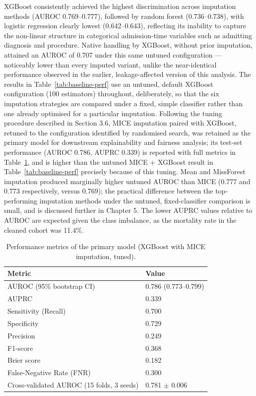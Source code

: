 \documentclass[12pt,a4paper]{report}
\begin{document}
XGBoost consistently achieved the highest discrimination across imputation methods (AUROC 0.769--0.777), followed by random forest (0.736--0.738), with logistic regression clearly lowest (0.642--0.643), reflecting its inability to capture the non-linear structure in categorical admission-time variables such as admitting diagnosis and procedure. Native handling by XGBoost, without prior imputation, attained an AUROC of 0.707 under this same untuned configuration --- noticeably lower than every imputed variant, unlike the near-identical performance observed in the earlier, leakage-affected version of this analysis. The results in Table~\ref{tab:baseline-perf} use an untuned, default XGBoost configuration (100 estimators) throughout, deliberately, so that the six imputation strategies are compared under a fixed, simple classifier rather than one already optimised for a particular imputation. Following the tuning procedure described in Section 3.6, MICE imputation paired with XGBoost, retuned to the configuration identified by randomised search, was retained as the primary model for downstream explainability and fairness analysis; its test-set performance (AUROC 0.786, AUPRC 0.339) is reported with full metrics in Table~\ref{tab:best-model-metrics}, and is higher than the untuned MICE + XGBoost result in Table~\ref{tab:baseline-perf} precisely because of this tuning. Mean and MissForest imputation produced marginally higher untuned AUROC than MICE (0.777 and 0.773 respectively, versus 0.769); the practical difference between the top-performing imputation methods under the untuned, fixed-classifier comparison is small, and is discussed further in Chapter 5. The lower AUPRC values relative to AUROC are expected given the class imbalance, as the mortality rate in the cleaned cohort was 11.4\%.


\begin{table}[H]
\centering
\caption{Performance metrics of the primary model (XGBoost with MICE imputation, tuned).}
\label{tab:best-model-metrics}
\begin{tabular}{ll}
\toprule
Metric & Value \\
\midrule
AUROC (95\% bootstrap CI) & 0.786 (0.773--0.799) \\
AUPRC & 0.339 \\
Sensitivity (Recall) & 0.700 \\
Specificity & 0.729 \\
Precision & 0.249 \\
F1-score & 0.368 \\
Brier score & 0.182 \\
False-Negative Rate (FNR) & 0.300 \\
Cross-validated AUROC (15 folds, 3 seeds) & 0.781 $\pm$ 0.006 \\
\bottomrule
\end{tabular}
\end{table}
\end{document}
